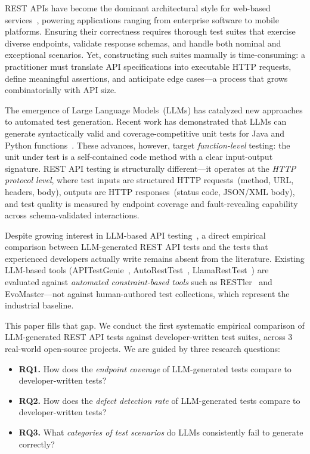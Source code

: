 \documentclass[sigconf,review,anonymous=false]{acmart}
\begin{document}
REST APIs have become the dominant architectural style for web-based
services~\cite{Fielding2000}, powering applications ranging from
enterprise software to mobile platforms. Ensuring their correctness requires
thorough test suites that exercise diverse endpoints, validate response schemas,
and handle both nominal and exceptional scenarios. Yet, constructing such suites
manually is time-consuming: a practitioner must translate API specifications
into executable HTTP requests, define meaningful assertions, and anticipate
edge cases---a process that grows combinatorially with API size.

The emergence of Large Language Models~(LLMs) has catalyzed new approaches
to automated test generation. Recent work has demonstrated that LLMs can
generate syntactically valid and coverage-competitive unit tests for
Java and Python functions~\cite{Schafer2024,Yuan2023}. These advances, however,
target \emph{function-level} testing: the unit under test is a self-contained
code method with a clear input-output signature. REST API testing is
structurally different---it operates at the \emph{HTTP protocol level}, where
test inputs are structured HTTP requests~(method, URL, headers, body), outputs
are HTTP responses~(status code, JSON/XML body), and test quality is measured
by endpoint coverage and fault-revealing capability across schema-validated
interactions.

Despite growing interest in LLM-based API
testing~\cite{Pereira2024,Stennett2025,Kim2025}, a direct empirical comparison
between LLM-generated REST API tests and the tests that experienced developers
actually write remains absent from the literature. Existing LLM-based tools
(APITestGenie~\cite{Pereira2024}, AutoRestTest~\cite{Stennett2025},
LlamaRestTest~\cite{Kim2025}) are evaluated against \emph{automated constraint-based
tools} such as RESTler~\cite{Atlidakis2019} and EvoMaster---not against
human-authored test collections, which represent the industrial baseline.

This paper fills that gap. We conduct the first systematic empirical comparison
of LLM-generated REST API tests against developer-written test suites, across
3 real-world open-source projects. We are guided by three research
questions:

\begin{itemize}
  \item \textbf{RQ1.} How does the \emph{endpoint coverage} of LLM-generated
    tests compare to developer-written tests?
  \item \textbf{RQ2.} How does the \emph{defect detection rate} of
    LLM-generated tests compare to developer-written tests?
  \item \textbf{RQ3.} What \emph{categories of test scenarios} do LLMs
    consistently fail to generate correctly?
\end{itemize}
\end{document}
